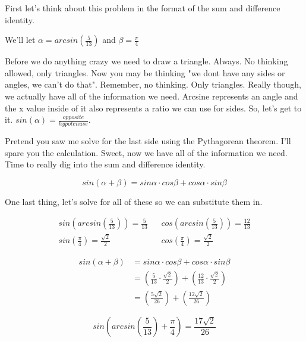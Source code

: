 \documentclass[10pt,letterpaper]{amspset}
\begin{document}
\begin{solution}
    First let's think about this problem in the format of the sum and difference identity. \medskip
    
    We'll let $\alpha = arcsin \left( \frac{5}{13} \right)$ and $\beta = \frac{\pi}{4}$
    
    \medskip
    Before we do anything crazy we need to draw a triangle. Always. No thinking allowed, only triangles. Now you may be thinking "we dont have any sides or angles, we can't do that". Remember, no thinking. Only triangles. Really though, we actually have all of the information we need. Arcsine represents an angle and the x value inside of it also represents a ratio we can use for sides. So, let's get to it. $sin(\alpha) = \frac{opposite}{hypotenuse}$. 
    
    
    Pretend you saw me solve for the last side using the Pythagorean theorem. I'll spare you the calculation. Sweet, now we have all of the information we need. Time to really dig into the sum and difference identity.
    
    \[ sin(\alpha + \beta) = sin\alpha \cdot cos\beta + cos\alpha \cdot sin\beta \]
    
    One last thing, let's solve for all of these so we can substitute them in.
    
    \begin{align}
        sin \left( arcsin \left( \frac{5}{13} \right) \right) = \frac{5}{13} && cos \left( arcsin \left( \frac{5}{13} \right) \right) = \frac{12}{13} \\
        sin\left( \frac{\pi}{4} \right) = \frac{\sqrt{2}}{2} && cos \left( \frac{\pi}{4} \right) = \frac{\sqrt{2}}{2}
    \end{align}
    
    \begin{align}
        sin(\alpha + \beta) &= sin\alpha \cdot 
        cos\beta + cos\alpha \cdot sin\beta \\
        &= \left( \frac{5}{13} \cdot \frac{\sqrt{2}}{2} \right) + \left( \frac{12}{13} \cdot \frac{\sqrt{2}}{2} \right) \\
        &= \left( \frac{5\sqrt{2}}{26} \right) + \left( \frac{12\sqrt{2}}{26} \right)
    \end{align}
    
    \[\boxed{ sin \left( arcsin \left( \frac{5}{13} \right) + \frac{\pi}{4} \right) = \frac{17\sqrt{2}}{26}  }\]
\end{solution}
\end{document}
